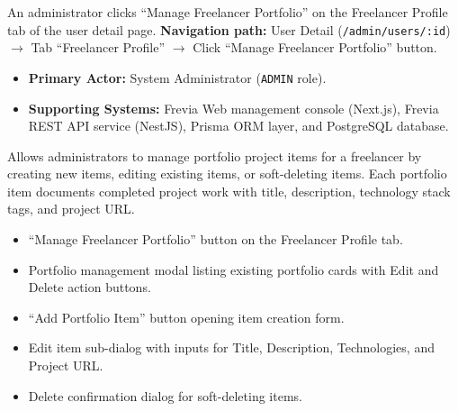 An administrator clicks ``Manage Freelancer Portfolio'' on the Freelancer Profile tab of the user detail page.\newline
\textbf{Navigation path:} User Detail (\texttt{/admin/users/:id}) $\rightarrow$ Tab ``Freelancer Profile'' $\rightarrow$ Click ``Manage Freelancer Portfolio'' button.


\begin{itemize}[leftmargin=1.6em,topsep=3pt,itemsep=2pt,parsep=0pt,label=$\bullet$]
    \item \textbf{Primary Actor:} System Administrator (\texttt{ADMIN} role).
    \item \textbf{Supporting Systems:} Frevia Web management console (Next.js), Frevia REST API service (NestJS), Prisma ORM layer, and PostgreSQL database.
\end{itemize}

\noindent Allows administrators to manage portfolio project items for a freelancer by creating new items, editing existing items, or soft-deleting items. Each portfolio item documents completed project work with title, description, technology stack tags, and project URL.

\begin{itemize}[leftmargin=1.6em,topsep=3pt,itemsep=2pt,parsep=0pt,label=$\bullet$]
    \item ``Manage Freelancer Portfolio'' button on the Freelancer Profile tab.
    \item Portfolio management modal listing existing portfolio cards with Edit and Delete action buttons.
    \item ``Add Portfolio Item'' button opening item creation form.
    \item Edit item sub-dialog with inputs for Title, Description, Technologies, and Project URL.
    \item Delete confirmation dialog for soft-deleting items.
\end{itemize}

